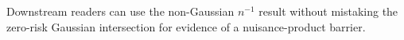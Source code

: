 Downstream readers can use the non-Gaussian \(n^{-1}\) result without mistaking the zero-risk Gaussian intersection for evidence of a nuisance-product barrier.